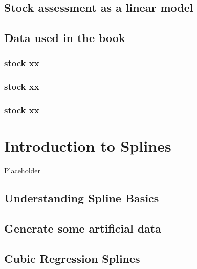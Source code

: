 \documentclass[
]{book}
\begin{document}
\hypertarget{stock-assessment-as-a-linear-model}{%
\section{Stock assessment as a linear model}\label{stock-assessment-as-a-linear-model}}

\hypertarget{data-used-in-the-book}{%
\section{Data used in the book}\label{data-used-in-the-book}}

\hypertarget{stock-xx}{%
\subsection{stock xx}\label{stock-xx}}

\hypertarget{stock-xx-1}{%
\subsection{stock xx}\label{stock-xx-1}}

\hypertarget{stock-xx-2}{%
\subsection{stock xx}\label{stock-xx-2}}

\hypertarget{introduction-to-splines}{%
\chapter{Introduction to Splines}\label{introduction-to-splines}}

Placeholder

\hypertarget{understanding-spline-basics}{%
\section{Understanding Spline Basics}\label{understanding-spline-basics}}

\hypertarget{generate-some-artificial-data}{%
\section{Generate some artificial data}\label{generate-some-artificial-data}}

\hypertarget{cubic-regression-splines}{%
\section{Cubic Regression Splines}\label{cubic-regression-splines}}
\end{document}
